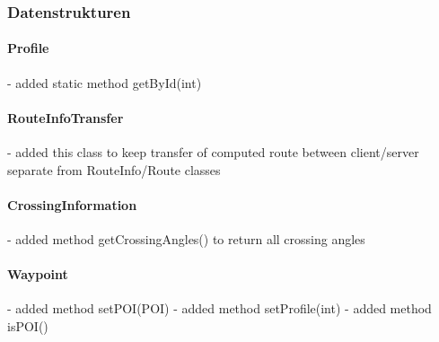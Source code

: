 \subsubsection{Datenstrukturen}

\paragraph{Profile}
- added static method getById(int)

\paragraph{RouteInfoTransfer}
- added this class to keep transfer of computed route between client/server separate from RouteInfo/Route classes

\paragraph{CrossingInformation}
- added method getCrossingAngles() to return all crossing angles

\paragraph{Waypoint}
- added method setPOI(POI)
- added method setProfile(int)
- added method isPOI()
